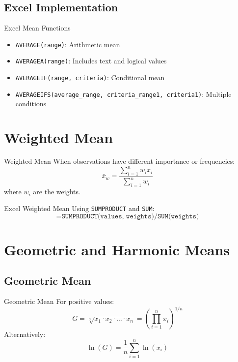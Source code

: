\documentclass[12pt,a4paper]{book}
\begin{document}
\subsection{Excel Implementation}

\begin{example}{Excel Mean Functions}
\begin{itemize}
    \item \texttt{AVERAGE(range)}: Arithmetic mean
    \item \texttt{AVERAGEA(range)}: Includes text and logical values
    \item \texttt{AVERAGEIF(range, criteria)}: Conditional mean
    \item \texttt{AVERAGEIFS(average\_range, criteria\_range1, criteria1)}: Multiple conditions
\end{itemize}
\end{example}

\section{Weighted Mean}

\begin{definition}{Weighted Mean}
When observations have different importance or frequencies:
\[
\bar{x}_w = \frac{\sum_{i=1}^{n} w_i x_i}{\sum_{i=1}^{n} w_i}
\]
where $w_i$ are the weights.
\end{definition}

\begin{example}{Excel Weighted Mean}
Using \texttt{SUMPRODUCT} and \texttt{SUM}:
\[
\texttt{=SUMPRODUCT(values, weights)/SUM(weights)}
\]
\end{example}

\section{Geometric and Harmonic Means}

\subsection{Geometric Mean}

\begin{definition}{Geometric Mean}
For positive values:
\[
G = \sqrt[n]{x_1 \cdot x_2 \cdot \ldots \cdot x_n} = \left(\prod_{i=1}^{n} x_i\right)^{1/n}
\]
Alternatively:
\[
\ln(G) = \frac{1}{n} \sum_{i=1}^{n} \ln(x_i)
\]
\end{definition}
\end{document}
